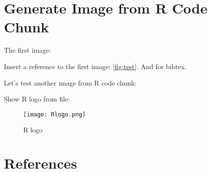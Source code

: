 \section{Generate Image from R Code Chunk}

The first image:

\Rcodeplaceholder{}

Insert a reference to the first image: \ref{fig:test}. And for bibtex\cite{Yinxiang:2024}.

Let's test another image from R code chunk:

\Rcodeplaceholder{}

Show R logo from file:

\begin{figure}
\centering
\texttt{[image: Rlogo.png]}
\caption{R logo}
\end{figure}

\section*{References}



